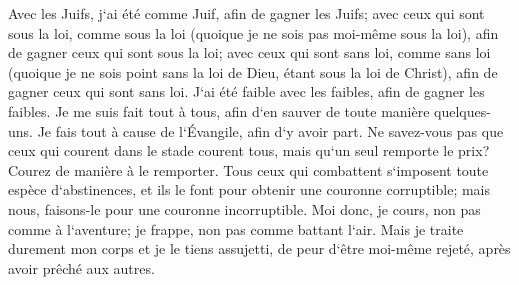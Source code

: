 \verse Avec les Juifs, j`ai été comme Juif, afin de gagner les Juifs; avec ceux qui sont sous la loi, comme sous la loi (quoique je ne sois pas moi-même sous la loi), afin de gagner ceux qui sont sous la loi; 
\verse avec ceux qui sont sans loi, comme sans loi (quoique je ne sois point sans la loi de Dieu, étant sous la loi de Christ), afin de gagner ceux qui sont sans loi. 
\verse J`ai été faible avec les faibles, afin de gagner les faibles. Je me suis fait tout à tous, afin d`en sauver de toute manière quelques-uns. 
\verse Je fais tout à cause de l`Évangile, afin d`y avoir part. 
\verse Ne savez-vous pas que ceux qui courent dans le stade courent tous, mais qu`un seul remporte le prix? Courez de manière à le remporter. 
\verse Tous ceux qui combattent s`imposent toute espèce d`abstinences, et ils le font pour obtenir une couronne corruptible; mais nous, faisons-le pour une couronne incorruptible. 
\verse Moi donc, je cours, non pas comme à l`aventure; je frappe, non pas comme battant l`air. 
\verse Mais je traite durement mon corps et je le tiens assujetti, de peur d`être moi-même rejeté, après avoir prêché aux autres. 

\chapter{}

